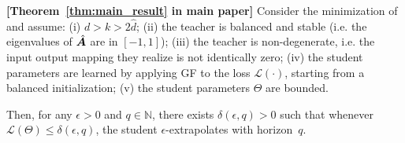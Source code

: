 


\begin{theorem}\textbf{[Theorem~\ref{thm:main_result} in main paper]}
\label{thm:approx_extrapolation}
Consider the minimization of  and assume: (i) $d>k>2\hat{d}$; (ii) the teacher is balanced and stable (i.e. the eigenvalues of $\hat{{\bm{A}}}$ are in $[-1,1]$); (iii) the teacher is non-degenerate, i.e. the input output mapping they realize is not identically zero; (iv) the student parameters are learned by applying GF to the loss $\mathcal{L}(\cdot)$, starting from a balanced initialization; (v) the student parameters $\Theta$ are bounded.

Then, for any $\epsilon>0$ and $q\in\mathbb{N}$, there exists $\delta(\epsilon,q)>0$ such that whenever $\mathcal{L}(\Theta)\le \delta(\epsilon,q)$, the student $\epsilon$-extrapolates with horizon~$q$.

\end{theorem}

